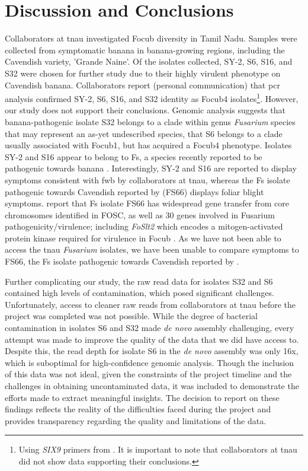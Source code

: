 \clearpage
\section{Discussion and Conclusions}

Collaborators at \ac{tnau} investigated \ac{Focub} diversity in Tamil Nadu. Samples were collected from symptomatic banana in banana-growing regions, including the Cavendish variety, 'Grande Naine'. Of the isolates collected, SY-2, S6, S16, and S32 were chosen for further study due to their highly virulent phenotype on Cavendish banana. Collaborators report (personal communication) that \ac{pcr} analysis confirmed SY-2, S6, S16, and S32 identity as \ac{Focub4} isolates\footnote{Using \textit{SIX9} primers from \textcite{Carvalhais2019}. It is important to note that collaborators at \ac{tnau} did not show data supporting their conclusions.}. However, our study does not support their conclusions. Genomic analysis suggests that banana-pathogenic isolate S32 belongs to a clade within genus \textit{Fusarium} species that may represent an as-yet undescribed species, that S6 belongs to a clade usually associated with \ac{Focub1}, but has acquired a \ac{Focub4} phenotype. Isolates SY-2 and S16 appear to belong to \ac{Fs}, a species recently reported to be pathogenic towards banana \parencite{Cui2021}. Interestingly, SY-2 and S16 are reported to display symptoms consistent with \ac{fwb} by collaborators at \ac{tnau}, whereas the \ac{Fs} isolate pathogenic towards Cavendish reported by \textcite{Cui2021} (FS66) displays foliar blight symptoms. \textcite{Cui2021} report that \ac{Fs} isolate FS66 has widespread gene transfer from core chromosomes identified in \ac{FOSC}, as well as 30 genes involved in Fusarium pathogenicity/virulence; including \textit{FoSlt2} which encodes a mitogen-activated protein kinase required for virulence in \ac{Focub} \parencite{ding2015mitogen}.  As we have not been able to access the \ac{tnau} \textit{Fusarium} isolates, we have been unable to compare symptoms to FS66, the \ac{Fs} isolate pathogenic towards Cavendish reported by \textcite{Cui2021}. 

Further complicating our study, the raw read data for isolates S32 and S6 contained high levels of contamination, which posed significant challenges. Unfortunately, access to cleaner raw reads from collaborators at \ac{tnau} before the project was completed was not possible. While the degree of bacterial contamination in isolates S6 and S32 made \textit{de novo} assembly challenging, every attempt was made to improve the quality of the data that we did have access to. Despite this, the read depth for isolate S6 in the \textit{de novo} assembly was only 16x, which is suboptimal for high-confidence genomic analysis. Though the inclusion of this data was not ideal, given the constraints of the project timeline and the challenges in obtaining uncontaminated data, it was included to demonstrate the efforts made to extract meaningful insights. The decision to report on these findings reflects the reality of the difficulties faced during the project and provides transparency regarding the quality and limitations of the data.

